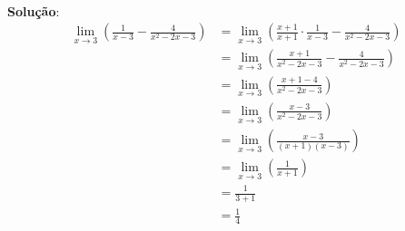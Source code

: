 \documentclass[12pt,a4paper,brazil]{article}
\begin{document}
\vspace{3mm} \\ %
\textbf{Solução}:
\begin{equation*}
	\begin{aligned}
		\lim\limits_{x \to 3} (\frac{1}{x - 3} - \frac{4}{x^2 - 2x - 3})
		&= \lim\limits_{x \to 3} (\frac{x + 1}{x + 1}\cdot\frac{1}{x - 3} - \frac{4}{x^2 - 2x - 3}) \\
		&= \lim\limits_{x \to 3} (\frac{x + 1}{x^2 - 2x - 3} - \frac{4}{x^2 - 2x - 3}) \\
		&= \lim\limits_{x \to 3} (\frac{x + 1 - 4}{x^2 - 2x - 3}) \\
		&= \lim\limits_{x \to 3} (\frac{x - 3}{x^2 - 2x - 3}) \\
		&= \lim\limits_{x \to 3} (\frac{x - 3}{(x + 1)(x - 3)}) \\
		&= \lim\limits_{x \to 3} (\frac{1}{x + 1}) \\
		&= \frac{1}{3 + 1} \\
		&= \frac{1}{4}
	\end{aligned}
\end{equation*}
\end{document}
